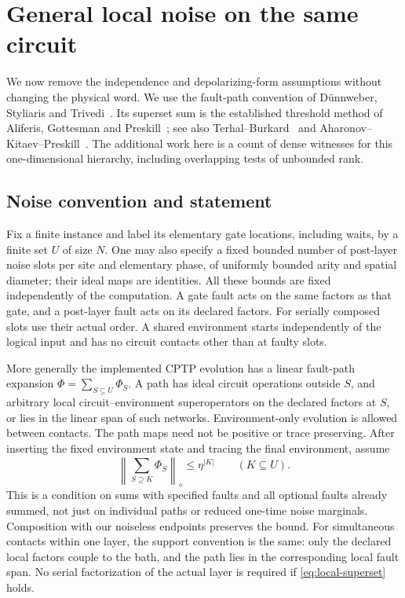 \section{General local noise on the same circuit}\label{sec:general-noise}
We now remove the independence and depolarizing-form assumptions without changing the physical word. We use the fault-path convention of D\"unnweber, Styliaris and Trivedi~\cite[Definition~3]{DST2026}. Its superset sum is the established threshold method of Aliferis, Gottesman and Preskill~\cite{AGP2006}; see also Terhal--Burkard~\cite{TB2005} and Aharonov--Kitaev--Preskill~\cite{AKP2006}. The additional work here is a count of dense witnesses for this one-dimensional hierarchy, including overlapping tests of unbounded rank.

\subsection{Noise convention and statement}
Fix a finite instance and label its elementary gate locations, including waits, by a finite set $U$ of size $N$. One may also specify a fixed bounded number of post-layer noise slots per site and elementary phase, of uniformly bounded arity and spatial diameter; their ideal maps are identities. All these bounds are fixed independently of the computation. A gate fault acts on the same factors as that gate, and a post-layer fault acts on its declared factors. For serially composed slots use their actual order. A shared environment starts independently of the logical input and has no circuit contacts other than at faulty slots.

More generally the implemented CPTP evolution has a linear fault-path expansion $\Phi=\sum_{S\subseteq U}\Phi_S$. A path has ideal circuit operations outside $S$, and arbitrary local circuit--environment superoperators on the declared factors at $S$, or lies in the linear span of such networks. Environment-only evolution is allowed between contacts. The path maps need not be positive or trace preserving. After inserting the fixed environment state and tracing the final environment, assume
\begin{equation}\label{eq:local-superset}
 \left\|\sum_{S\supseteq K}\Phi_S\right\|_\diamond
 \le\eta^{|K|}\qquad(K\subseteq U).
\end{equation}
This is a condition on sums with specified faults and all optional faults already summed, not just on individual paths or reduced one-time noise marginals. Composition with our noiseless endpoints preserves the bound. For simultaneous contacts within one layer, the support convention is the same: only the declared local factors couple to the bath, and the path lies in the corresponding local fault span. No serial factorization of the actual layer is required if \eqref{eq:local-superset} holds.

